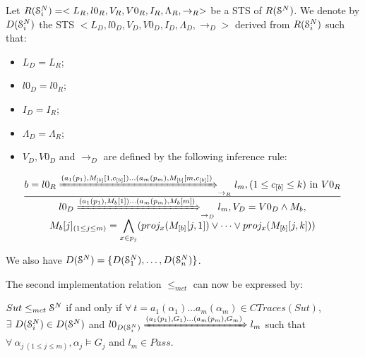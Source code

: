 \begin{definition}
    Let
    $R(\EuScript{S}_i^{N})=<L_R,l0_R,V_R,V0_R,I_R,\Lambda_R,\rightarrow_R>$
    be a STS of $R(\EuScript{S}^{N})$. We denote by
    $D(\EuScript{S}_i^{N})$ the STS $
    <L_D,l0_D,V_D,V0_D,I_D,\Lambda_D,\rightarrow_D>$ derived from
    $R(\EuScript{S}_i^{N})$ such that:

    \begin{itemize}
        \item $L_D=L_{R}$;

        \item $l0_D=l0_{R}$;

        \item $I_D=I_{R}$;

        \item $\Lambda_D=\Lambda_{R}$;

        \item $V_D, V0_D$ and $\rightarrow_D$ are defined by the
            following inference rule:

            $\frac{
                \begin{matrix}
                b=l0_{R}
                \xRightarrow{(a_1(p_1),M_{[b]}[1,c_{[b]}])\dots
                (a_m(p_m),M_{[b]}[m,c_{[b]}])}_{\rightarrow_{R}}
                l_{m},
                (1 \leq c_{[b]} \leq k) \text{ in } V0_{R}
                \end{matrix}
            }
            {
                \begin{matrix}
                l0_D
                \xRightarrow{(a_1(p_1),M_{b}[1])\dots (a_m(p_m),M_{b}[m])}_{\rightarrow_D}
                l_m, V_D=V0_D \wedge M_{b},\\
                M_{b}[j]_{(1\leq j \leq m)} = \displaystyle
                \bigwedge_{x \in p_j} ( proj_x(M_{[b]}[j, 1])
                \vee \dots \vee proj_x(M_{[b]}[j, k]))

                \end{matrix}
            }$
    \end{itemize}

    We also have $D(\EuScript{S}^{N}) =
    \{D(\EuScript{S}_1^{N}),\dots,D(\EuScript{S}_n^{N}) \}$.
\end{definition}

The second implementation relation $\leq_{mct}$ can now be
expressed by:

\begin{proposition}
    ${Sut} \leq_{mct} \EuScript{S}^{N}$ if and only if $\forall
    ~t= a_1(\alpha_1) \dots a_m(\alpha_m) \in CTraces({Sut})$,
    $\exists ~D(\EuScript{S}_i^{N}) \in D(\EuScript{S}^{N})$ and
    $l0_{D(\EuScript{S}_i^{N})} \xRightarrow{(a_1(p_1),G_{1})
    \dots (a_m(p_m),G_{m})} l_m$ such that $\forall
    ~\alpha_{j ~(1 \leq j \leq m)}, \alpha_j \models G_{j}$ and
    $l_m \in Pass$.
\end{proposition}


